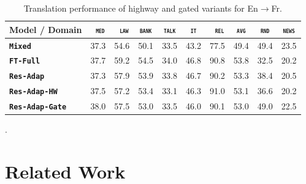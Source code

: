 \documentclass[11pt,a4paper]{article}
\newcommand{\fyFuture}[1]{\done[FY]\Todo[FY:]{\textcolor{red}{#1}}}
\newcommand{\mpDone}[1]{\done[MP]\Todo[MP:]{\textcolor{green}{#1}}}
\newcommand{\domain}[1]{\texttt{\textsc{#1}}}
\newcommand{\system}[1]{\texttt{\textbf{#1}}}
\begin{document}
\begin{table}[htbp]
  \centering
  \begin{tabular}{|p{3cm}|*{7}{r|}|r|r|} \hline
    Model / Domain & \multicolumn{1}{c|}{\domain{ med}} & \multicolumn{1}{c|}{\domain{ law}} & \multicolumn{1}{c|}{\domain{bank}} & \multicolumn{1}{c|}{\domain{talk}} & \multicolumn{1}{c|}{\domain{ it }} & \multicolumn{1}{c|}{\domain{ rel}} & \multicolumn{1}{c||}{\domain{avg}} & \multicolumn{1}{c|}{\domain{rnd}} & \multicolumn{1}{c|}{\domain{news}} \\ \hline %
    \system{Mixed}             & 37.3 & 54.6 & 50.1 & 33.5 & 43.2 & 77.5     &  49.4 & 49.4 & 23.5 \\ %
    \system{FT-Full}             & 37.7 & 59.2 & 54.5 & 34.0 & 46.8 & 90.8   & 53.8 & 32.5 & 20.2  \\ %
    \system{Res-Adap}         & 37.3 & 57.9 & 53.9 & 33.8 & 46.7 & 90.2   & 53.3 & 38.4 & 20.5 \\ %
    \system{Res-Adap-HW}   & 37.5 & 57.2 & 53.4 & 33.1 & 46.3 & 91.0  & 53.1 & 36.6 & 20.2 \\ %
    \system{Res-Adap-Gate}  & 38.0 & 57.5& 53.0 & 33.5 & 46.0 & 90.1  & 53.0 & 49.0 & 22.5 \\ %
    \hline
  \end{tabular}
  \caption{Translation performance of highway and gated variants for En$\rightarrow$Fr.
  }
  \label{tab:performance-random}
\end{table}
\fyFuture{Computation time should also report the time it takes for the complete tuning process, not one iteration which will be more or less the same}.
\section{Related Work \label{sec:related}}
\mpDone{related work}
\end{document}
